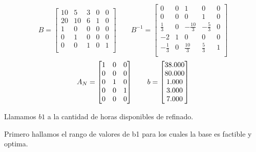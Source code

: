 \documentclass[10pt,a4paper]{article}
\begin{document}
\begin{enumerate}[label=\textbf{\sffamily\large\arabic*.}]
    \[
    B = \begin{bmatrix}
    10 & 5  & 3 & 0 & 0 \\
    20 & 10 & 6 & 1 & 0 \\
    1  & 0  & 0 & 0 & 0 \\
    0  & 1  & 0 & 0 & 0 \\
    0  & 0  & 1 & 0 & 1 \\
    \end{bmatrix}
    \hspace{2em}
    B^{-1} = \begin{bmatrix}
        0           & 0 &    1	        &   0            &	0 \\
        0           & 0 &    0	        &   1            &	0 \\
      \frac{1}{3}   & 0 & -\frac{10}{3} & -\frac{5}{3}   &	0 \\
       -2           & 1 &    0	        &   0            &	0 \\
       -\frac{1}{3} & 0 & \frac{10}{3}	& \frac{5}{3}    &	1 \\
    \end{bmatrix}
    \]
    \vspace{1em}
    \[
        A_N = \begin{bmatrix}
        1 & 0 & 0 \\
        0 & 0 & 0 \\
        0 & 1 & 0 \\
        0 & 0 & 1 \\
        0 & 0 & 0 \\
        \end{bmatrix}
        \hspace{2em}
        b = \begin{bmatrix}
            $38.000$ \\
            $80.000$ \\
            $1.000$  \\
            $3.000$  \\
            $7.000$  \\
        \end{bmatrix}
    \]

    \vspace{1em}

Llamamos $b1$ a la cantidad de horas disponibles de refinado.

\vspace{0,5em}

Primero hallamos el rango de valores de b1 para los cuales la base es factible y optima. \\
    


\end{enumerate}
\end{document}
